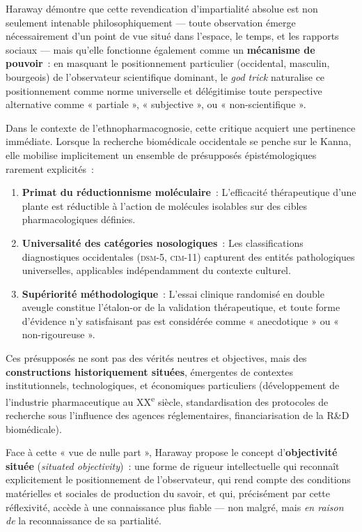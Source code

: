 \documentclass[12pt,a4paper,twoside]{book}
\begin{document}
Haraway démontre que cette revendication d'impartialité absolue est non seulement intenable philosophiquement --- toute observation émerge nécessairement d'un point de vue situé dans l'espace, le temps, et les rapports sociaux --- mais qu'elle fonctionne également comme un \textbf{mécanisme de pouvoir}~: en masquant le positionnement particulier (occidental, masculin, bourgeois) de l'observateur scientifique dominant, le \textit{god trick} naturalise ce positionnement comme norme universelle et délégitimise toute perspective alternative comme « partiale », « subjective », ou « non-scientifique ».

Dans le contexte de l'ethnopharmacognosie, cette critique acquiert une pertinence immédiate. Lorsque la recherche biomédicale occidentale se penche sur le Kanna, elle mobilise implicitement un ensemble de présupposés épistémologiques rarement explicités~:

\begin{enumerate}
\item \textbf{Primat du réductionnisme moléculaire}~: L'efficacité thérapeutique d'une plante est réductible à l'action de molécules isolables sur des cibles pharmacologiques définies.

\item \textbf{Universalité des catégories nosologiques}~: Les classifications diagnostiques occidentales (\textsc{dsm}-5, \textsc{cim}-11) capturent des entités pathologiques universelles, applicables indépendamment du contexte culturel.

\item \textbf{Supériorité méthodologique}~: L'essai clinique randomisé en double aveugle constitue l'étalon-or de la validation thérapeutique, et toute forme d'évidence n'y satisfaisant pas est considérée comme « anecdotique » ou « non-rigoureuse ».
\end{enumerate}

Ces présupposés ne sont pas des vérités neutres et objectives, mais des \textbf{constructions historiquement situées}, émergentes de contextes institutionnels, technologiques, et économiques particuliers (développement de l'industrie pharmaceutique au XX\textsuperscript{e} siècle, standardisation des protocoles de recherche sous l'influence des agences réglementaires, financiarisation de la R\&D biomédicale).

Face à cette « vue de nulle part », Haraway propose le concept d'\textbf{objectivité située} (\textit{situated objectivity})~: une forme de rigueur intellectuelle qui reconnaît explicitement le positionnement de l'observateur, qui rend compte des conditions matérielles et sociales de production du savoir, et qui, précisément par cette réflexivité, accède à une connaissance plus fiable --- non malgré, mais \textit{en raison de} la reconnaissance de sa partialité.
\end{document}
